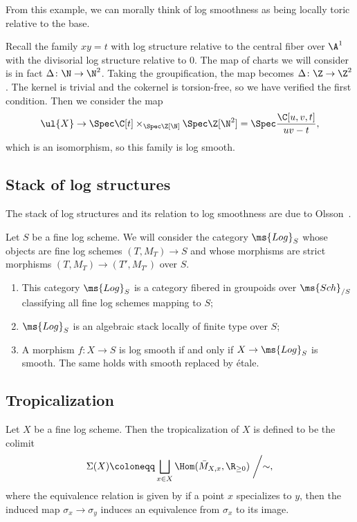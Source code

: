 From this example, we can morally think of log smoothness as being locally toric relative to the base.

\begin{exm}
    Recall the family \(xy = t\) with log structure relative to the central fiber over \(\A^1\) with the divisorial log structure relative to \(0\). The map of charts we will consider is in fact \(\Delta \colon \N \to \N^2\). Taking the groupification, the map becomes \(\Delta \colon \Z \to \Z^2\). The kernel is trivial and the cokernel is torsion-free, so we have verified the first condition. Then we consider the map
    \[ \ul{X} \to \Spec \C[t] \times_{\Spec \Z[\N]} \Spec \Z[\N^2] = \Spec \frac{\C[u,v,t]}{uv-t}, \]
    which is an isomorphism, so this family is log smooth.
\end{exm}

\subsection{Stack of log structures}%
\label{sub:Stack of log structures}

The stack of log structures and its relation to log smoothness are due to Olsson~\cite{Olsson2003}.

Let \(S\) be a fine log scheme. We will consider the category \(\ms{Log}_S\) whose objects are fine log schemes \((T, M_T) \to S\) and whose morphisms are strict morphisms \((T, M_T) \to (T', M_{T'})\) over \(S\).
\begin{enumerate}
    \item This category \(\ms{Log}_S\) is a category fibered in groupoids over \(\ms{Sch}_{/S}\) classifying all fine log schemes mapping to \(S\);
    \item \(\ms{Log}_S\) is an algebraic stack locally of finite type over \(S\);
    \item A morphism \(f \colon X \to S\) is log smooth if and only if \(X \to \ms{Log}_S\) is smooth. The same holds with smooth replaced by \'etale.
\end{enumerate}

\subsection{Tropicalization}%
\label{sub:Tropicalization}

Let \(X\) be a fine log scheme. Then the tropicalization of \(X\) is defined to be the colimit
\[\Sigma(X) \coloneqq \bigsqcup_{x \in X} \Hom(\bar{M}_{X,x}, \R_{\geq 0}) \biggm/ \sim, \]
where the equivalence relation is given by if a point \(x\) specializes to \(y\), then the induced map \(\sigma_x \to \sigma_y\) induces an equivalence from \(\sigma_x\) to its image. 

